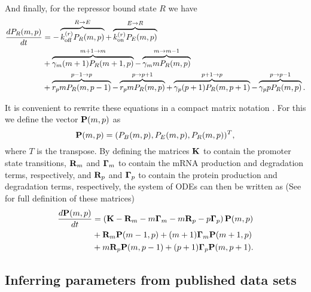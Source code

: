 And finally, for the repressor bound state $R$ we have
\begin{equation}
  \begin{aligned}
    \dt{P_R(m, p)} &=
    - \overbrace{\kroff P_R(m, p)}^{R \rightarrow E} %
    + \overbrace{\kron P_E(m, p)}^{E \rightarrow R}\\ %
    &+ \overbrace{\gm (m + 1) P_R(m+1 , p)}^{m+1 \rightarrow m} %
    - \overbrace{\gm m P_R(m , p)}^{m \rightarrow m-1}\\ %
    &+ \overbrace{r_p m P_R(m, p - 1)}^{p-1 \rightarrow p} %
    - \overbrace{r_p m P_R(m, p)}^{p \rightarrow p+1} %
    + \overbrace{\gp (p + 1) P_R(m, p + 1)}^{p + 1 \rightarrow p} %
    - \overbrace{\gp p P_R(m, p)}^{p \rightarrow p-1}. %
  \end{aligned}
\end{equation}

It is convenient to rewrite these equations in a compact matrix notation
\cite{Sanchez2013}. For this we define the vector $\mathbf{P}(m, p)$ as
\begin{equation}
  \mathbf{P}(m, p) = (P_B(m, p), P_E(m, p), P_R(m, p))^T,
\end{equation}
where $T$ is the transpose. By defining the matrices $\mathbf{K}$ to contain the
promoter state transitions, $\mathbf{R}_m$ and $\mathbf{\Gamma}_m$ to contain the mRNA production and
degradation terms, respectively, and $\mathbf{R}_p$ and $\mathbf{\Gamma}_p$ to contain the protein
production and degradation terms, respectively, the system of ODEs can then be
written as (See  for full definition of these matrices)
\begin{equation}
  \begin{aligned}
    {d{\mathbf{P}(m, p)} \over dt} &= \left( \mathbf{K} -\mathbf{R}_m -m\mathbf{\Gamma}_m -m\mathbf{R}_p -p\mathbf{\Gamma}_p \right) \mathbf{P}(m, p)\\
    &+ \mathbf{R}_m \mathbf{P}(m-1, p)
    + (m + 1) \mathbf{\Gamma}_m \mathbf{P}(m + 1, p)\\
    &+ m \mathbf{R}_p \mathbf{P}(m, p - 1)
    + (p + 1) \mathbf{\Gamma}_p \mathbf{P}(m, p + 1).
  \end{aligned}
  \label{eq_cme_matrix}
\end{equation}

\subsection{Inferring parameters from published data sets}
\label{sec_param}

